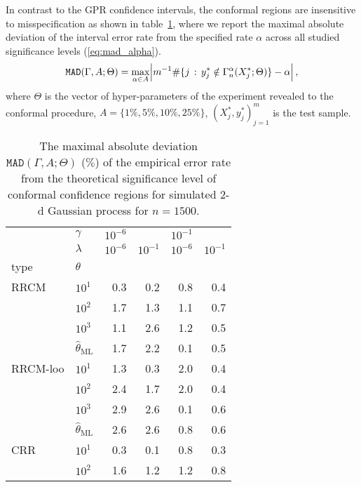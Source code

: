 \documentclass[10pt, conference, compsocconf]{IEEEtran}
\begin{document}
In contrast to the GPR confidence intervals, the conformal regions are insensitive
to misspecification as shown in table~\ref{tab:gaussian_2d_cov_conf}, where we report
the maximal absolute deviation of the interval error rate from the specified
rate $\alpha$ across all studied significance levels (\ref{eq:mad_alpha}).
\begin{equation} \label{eq:mad_alpha}
  \mathtt{MAD}(\Gamma, A; \Theta)
  = \max_{\alpha\in A}\Bigl\lvert
    m^{-1}\#\{j\,:\, y^*_j\notin \Gamma^\alpha_n(X^*_j; \Theta)\} - \alpha
  \Bigr\rvert
    \,,
\end{equation}
where $\Theta$ is the vector of hyper-parameters of the experiment revealed to the
conformal procedure, $A = \{1\%, 5\%, 10\%, 25\%\}$, $(X^*_j, y^*_j)_{j=1}^m$ is
the test sample.
\begin{table}
  \centering
  \caption{The maximal absolute deviation $\mathtt{MAD}(\Gamma, A; \Theta)$ ($\%$)
  of the empirical error rate from the theoretical significance level of conformal
  confidence regions for simulated $2$-d Gaussian process for $n=1500$.}
  \label{tab:gaussian_2d_cov_conf}
  \begin{tabular}{ll||rrrr}
  \toprule
       & $\gamma$ & $10^{-6}$ &          & $10^{-1}$ &          \\\cline{2-2}
       & $\lambda$ & $10^{-6}$ & $10^{-1}$ & $10^{-6}$ & $10^{-1}$ \\\cline{2-2}
  type & $\theta$ &          &          &          &          \\
  \midrule
  RRCM & $10^1$ &      0.3 &      0.2 &      0.8 &      0.4 \\
       & $10^2$ &      1.7 &      1.3 &      1.1 &      0.7 \\
       & $10^3$ &      1.1 &      2.6 &      1.2 &      0.5 \\
       & $\hat{\theta}_\text{ML}$ &      1.7 &      2.2 &      0.1 &      0.5 \\
  \midrule
  RRCM-loo & $10^1$ &      1.3 &      0.3 &      2.0 &      0.4 \\
       & $10^2$ &      2.4 &      1.7 &      2.0 &      0.4 \\
       & $10^3$ &      2.9 &      2.6 &      0.1 &      0.6 \\
       & $\hat{\theta}_\text{ML}$ &      2.6 &      2.6 &      0.8 &      0.6 \\
  \midrule
  CRR & $10^1$ &      0.3 &      0.1 &      0.8 &      0.3 \\
       & $10^2$ &      1.6 &      1.2 &      1.2 &      0.8 \\

\end{tabular}
\end{table}
\end{document}

